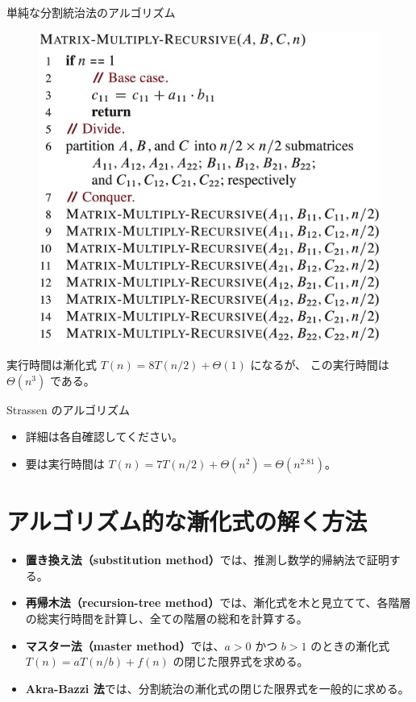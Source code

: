 \documentclass[unicode,11pt,aspectratio=169,notes]{beamer} %
\begin{document}
\begin{frame}{単純な分割統治法のアルゴリズム}
  \begin{figure}
    \includegraphics[height=0.60\textheight]{../resources/pseudo-04-02}
  \end{figure}
  実行時間は漸化式 $T(n) = 8T(n/2) + \Theta(1)$ になるが、
  この実行時間は $\Theta(n^3)$ である。
\end{frame}

\begin{frame}{Strassen のアルゴリズム}
  \begin{itemize}
    \item 詳細は各自確認してください。
    \item 要は実行時間は $T(n) = 7T(n/2) + \Theta(n^2) = \Theta(n^{2.81})$。
  \end{itemize}
\end{frame}

\section*{アルゴリズム的な漸化式の解く方法}

\begin{frame}
  \sectionpage{}
\end{frame}

\begin{frame}
  \begin{itemize}
    \item \textbf{置き換え法（substitution method）}では、推測し数学的帰納法で証明する。
    \item \textbf{再帰木法（recursion-tree method）}では、漸化式を木と見立てて、各階層
    の総実行時間を計算し、全ての階層の総和を計算する。
    \item \textbf{マスター法（master method）}では、$a>0$ かつ $b>1$ のときの漸化式
    $T(n) = aT(n/b)+f(n)$ の閉じた限界式を求める。
    \item \textbf{Akra-Bazzi 法}では、分割統治の漸化式の閉じた限界式を一般的に求める。
  \end{itemize}
\end{frame}
\end{document}
